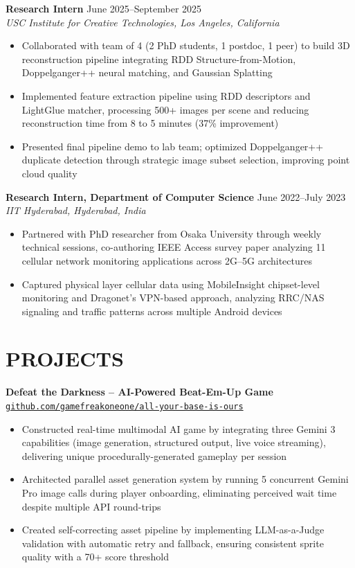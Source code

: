 \documentclass[10pt,letterpaper]{article}
\begin{document}
\textbf{Research Intern} \hfill June 2025--September 2025\\
\textit{USC Institute for Creative Technologies, Los Angeles, California}
\begin{itemize}
    \item Collaborated with team of 4 (2 PhD students, 1 postdoc, 1 peer) to build 3D reconstruction pipeline integrating RDD Structure-from-Motion, Doppelganger++ neural matching, and Gaussian Splatting
    \item Implemented feature extraction pipeline using RDD descriptors and LightGlue matcher, processing 500+ images per scene and reducing reconstruction time from 8 to 5 minutes (37\% improvement)
    \item Presented final pipeline demo to lab team; optimized Doppelganger++ duplicate detection through strategic image subset selection, improving point cloud quality
\end{itemize}

\vspace{-2pt}

\textbf{Research Intern, Department of Computer Science} \hfill June 2022--July 2023\\
\textit{IIT Hyderabad, Hyderabad, India}
\begin{itemize}
    \item Partnered with PhD researcher from Osaka University through weekly technical sessions, co-authoring IEEE Access survey paper analyzing 11 cellular network monitoring applications across 2G--5G architectures
    \item Captured physical layer cellular data using MobileInsight chipset-level monitoring and Dragonet's VPN-based approach, analyzing RRC/NAS signaling and traffic patterns across multiple Android devices
\end{itemize}

\vspace{-4pt}

\section*{PROJECTS}

\textbf{Defeat the Darkness -- AI-Powered Beat-Em-Up Game} \hfill \href{https://github.com/gamefreakoneone/all-your-base-is-ours}{\texttt{github.com/gamefreakoneone/all-your-base-is-ours}}
\begin{itemize}
    \item Constructed real-time multimodal AI game by integrating three Gemini 3 capabilities (image generation, structured output, live voice streaming), delivering unique procedurally-generated gameplay per session
    \item Architected parallel asset generation system by running 5 concurrent Gemini Pro image calls during player onboarding, eliminating perceived wait time despite multiple API round-trips
    \item Created self-correcting asset pipeline by implementing LLM-as-a-Judge validation with automatic retry and fallback, ensuring consistent sprite quality with a 70+ score threshold
\end{itemize}
\end{document}
